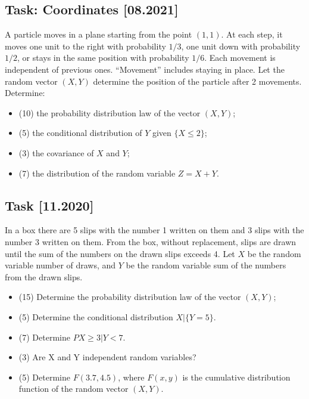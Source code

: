 \documentclass[a4paper, 12pt]{article}
\begin{document}
\subsection*{Task: Coordinates [08.2021]}

A particle moves in a plane starting from the point $(1, 1)$. At each step, it moves one unit to the right with probability $1/3$, one unit down with probability $1/2$, or stays in the same position with probability $1/6$. Each movement is independent of previous ones. “Movement” includes staying in place. Let the random vector $(X, Y)$ determine the position of the particle after 2 movements. Determine:

\begin{itemize}
    \item [a)] (10) the probability distribution law of the vector $(X, Y)$;
\item [b)] (5) the conditional distribution of $Y$ given $\{X \leq 2\}$;
\item [c)] (3) the covariance of $X$ and $Y$;
\item [d)] (7) the distribution of the random variable $Z = X + Y$.
\end{itemize}


\subsection*{Task [11.2020]}

In a box there are 5 slips with the number 1 written on them and 3 slips with the number 3 written on them. From the box, without replacement, slips are drawn until the sum of the numbers on the drawn slips exceeds 4. Let $X$ be the random variable number of draws, and $Y$ be the random variable sum of the numbers from the drawn slips.

\begin{itemize}

\item [a)] (15) Determine the probability distribution law of the vector $(X, Y)$;
\item [b)] (5) Determine the conditional distribution $X|\{Y=5\}$.
\item [c)] (7) Determine $P{X \geq 3 | Y < 7}$.
\item [d)] (3) Are X and Y independent random variables?
\item [e)] (5) Determine $F(3.7, 4.5)$, where $F(x, y)$ is the cumulative distribution function of the random vector $(X, Y)$.


\end{itemize}
\end{document}
